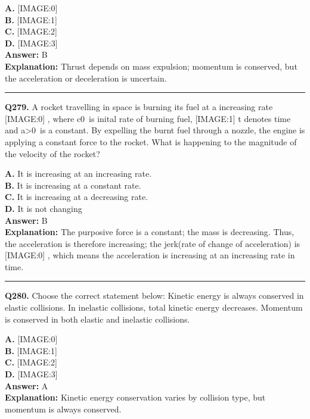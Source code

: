 \documentclass[12pt]{article}
\begin{document}
\textbf{A.} [IMAGE:0] \\
\textbf{B.} [IMAGE:1] \\
\textbf{C.} [IMAGE:2] \\
\textbf{D.} [IMAGE:3] \\

\textbf{Answer:} B \\
\textbf{Explanation:} Thrust depends on mass expulsion; momentum is conserved, but the acceleration or deceleration is uncertain.

\hrule
\vspace{1em}


\noindent
\textbf{Q279.} A rocket travelling in space is burning its fuel at a increasing rate
[IMAGE:0]
, where c0 is inital rate of burning fuel,
[IMAGE:1]
t denotes time and a>0 is a constant. By expelling the burnt fuel through a nozzle, the engine is applying a constant force to the rocket.
What is happening to the magnitude of the velocity of the rocket?



\textbf{A.} It is increasing at an increasing rate. \\
\textbf{B.} It is increasing at a constant rate. \\
\textbf{C.} It is increasing at a decreasing rate. \\
\textbf{D.} It is not changing \\

\textbf{Answer:} B \\
\textbf{Explanation:} The purposive force is a constant; the mass is decreasing.
Thus, the acceleration is therefore increasing;
the jerk(rate of change of acceleration) is
[IMAGE:0]
, which means the acceleration is increasing at an increasing rate in time.

\hrule
\vspace{1em}


\noindent
\textbf{Q280.} Choose the correct statement below:
Kinetic energy is always conserved in elastic collisions.
In inelastic collisions, total kinetic energy decreases.
Momentum is conserved in both elastic and inelastic collisions.



\textbf{A.} [IMAGE:0] \\
\textbf{B.} [IMAGE:1] \\
\textbf{C.} [IMAGE:2] \\
\textbf{D.} [IMAGE:3] \\

\textbf{Answer:} A \\
\textbf{Explanation:} Kinetic energy conservation varies by collision type, but momentum is always conserved.
\end{document}
